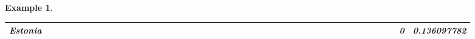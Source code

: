 \documentclass[a4paper,11pt]{report}
\newtheorem{example}[theorem]{Example}
\begin{document}
\begin{example}
\begin{appendices}
\begin{landscape}
\begin{longtable}{r|r|r|r|r|r|r|r|r|r|r|r|r|r|r|r|r|r|r|r|r|r|r|r|r|r|r|r|r|r|r|r|r|r|r|r|r|r|r|r|r|r|r|r|}
\multicolumn{1}{|r|}{\textbf{Estonia}}               &                                       &                                       &                                          &                                       &                                       &                                                     &                                        &                                       &                                      &                                       &                                       &                                                &                                       &                                      &                                       &                                       &                                      &                                       &                                       &                                      &                                      &                                         &                                     &                                       &                                      &                                      &                                        &                                       &                                      &                                      &                                        &                                        &                                     &                                      &                                           &                                               &                                      &                                       &                                              &                                      &                                     & 0                                             & 0.136097782                             \\ \hline

\end{longtable}
\end{landscape}
\end{appendices}
\end{example}
\end{document}
